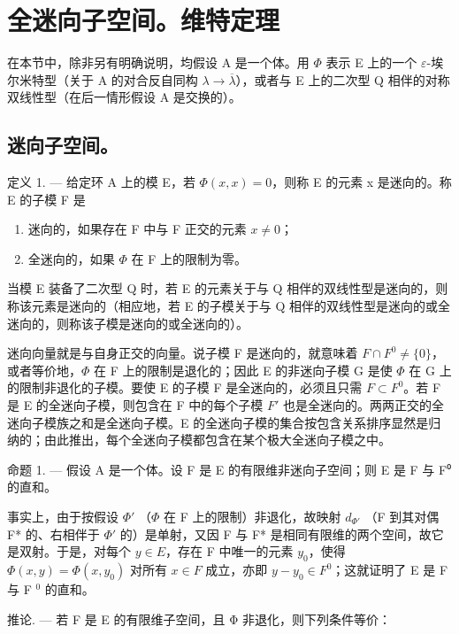 \section{全迷向子空间。维特定理}

在本节中，除非另有明确说明，均假设 A 是一个体。用 \(\Phi\) 表示 E 上的一个 \(\varepsilon\)-埃尔米特型（关于 A 的对合反自同构 \(\lambda \to \overline{\lambda}\)），或者与 E 上的二次型 Q 相伴的对称双线性型（在后一情形假设 A 是交换的）。

\subsection{迷向子空间。}

定义 1. --- 给定环 A 上的模 E，若 \(\Phi(x, x) = 0\)，则称 E 的元素 x 是迷向的。称 E 的子模 F 是

\begin{enumerate}
\def\labelenumi{\arabic{enumi})}
\item
  迷向的，如果存在 F 中与 F 正交的元素 \(x \neq 0\)；
\item
  全迷向的，如果 \(\Phi\) 在 F 上的限制为零。
\end{enumerate}

当模 E 装备了二次型 Q 时，若 E 的元素关于与 Q 相伴的双线性型是迷向的，则称该元素是迷向的（相应地，若 E 的子模关于与 Q 相伴的双线性型是迷向的或全迷向的，则称该子模是迷向的或全迷向的）。

迷向向量就是与自身正交的向量。说子模 F 是迷向的，就意味着 \(F \cap F^{0} \neq \{0\}\)，或者等价地，\(\Phi\) 在 F 上的限制是退化的；因此 E 的非迷向子模 G 是使 \(\Phi\) 在 G 上的限制非退化的子模。要使 E 的子模 F 是全迷向的，必须且只需 \(F \subset F^{0}\)。若 F 是 E 的全迷向子模，则包含在 F 中的每个子模 \(F'\) 也是全迷向的。两两正交的全迷向子模族之和是全迷向子模。E 的全迷向子模的集合按包含关系排序显然是归纳的；由此推出，每个全迷向子模都包含在某个极大全迷向子模之中。

命题 1. --- 假设 A 是一个体。设 F 是 E 的有限维非迷向子空间；则 E 是 F 与 F⁰ 的直和。

事实上，由于按假设 \(\Phi'\) （\(\Phi\) 在 F 上的限制）非退化，故映射 \(d_{\Phi'}\) （F 到其对偶 F* 的、右相伴于 \(\Phi'\) 的）是单射，又因 F 与 F* 是相同有限维的两个空间，故它是双射。于是，对每个 \(y \in E\)，存在 F 中唯一的元素 \(y_0\)，使得 \(\Phi(x, y) = \Phi(x, y_0)\) 对所有 \(x \in F\) 成立，亦即 \(y - y_0 \in F^0\)；这就证明了 E 是 F 与 F \(^0\) 的直和。

推论. --- 若 F 是 E 的有限维子空间，且 Φ 非退化，则下列条件等价：

